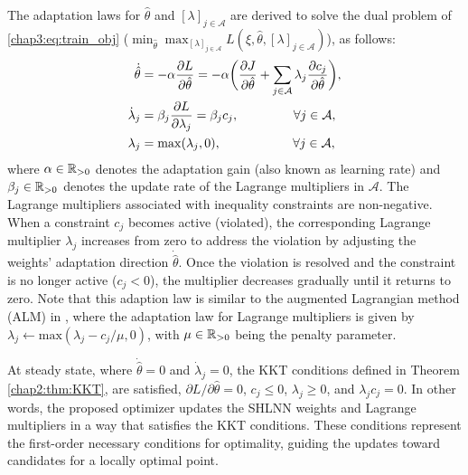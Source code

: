 The adaptation laws for $\hat\theta$ and $[\lambda]_{j\in\mathcal A}$ are derived to solve the dual problem of \eqref{chap3:eq:train_obj} (\ie  $\min_{\hat\theta} \max_{[\lambda]_{j\in\mathcal A}}L(\xi,\hat\theta,[\lambda]_{j\in\mathcal A})$), as follows:
\begin{subequations}
    \begin{align}
            \dot {\hat\theta}&=-\alpha {\partial L\over\partial \hat\theta}
            =-\alpha 
            \bigg(
            {\partial J\over \partial \hat\theta}+\sum_{j\in\mathcal{A}}
            \lambda_j {\partial c_j\over\partial \hat\theta}
            \bigg),
        \label{chap3:eq:adap_th}
            \\
            \dot\lambda_j& = \beta_j{\partial L\over\partial \lambda_j} = \beta_j c_j ,
            \quad\quad\quad\quad      \      
            \forall j\in\mathcal A,
        \label{chap3:eq:adap_L}
            \\
            \lambda_j & = \max(\lambda_j,0) ,
            \quad\quad\quad\quad\ \ \ \ \ 
            \forall j\in\mathcal A,
        \label{chap3:eq:adap_L_max}
    \end{align}
    \label{chap3:eq:adap}
\end{subequations}
where $\alpha\in\mathbb{R}_{>0}$ denotes the adaptation gain (also known as learning rate) and $\beta_j\in\mathbb{R}_{>0}$ denotes the update rate of the Lagrange multipliers in $\mathcal A$. 
The Lagrange multipliers associated with inequality constraints are non-negative.
When a constraint $c_j$ becomes active (\ie violated), the corresponding Lagrange multiplier $\lambda_j$ increases from zero to address the violation by adjusting the weights' adaptation direction $\dot{\hat\theta}$. 
Once the violation is resolved and the constraint is no longer active (\ie $c_j < 0$), the multiplier decreases gradually until it returns to zero. 
Note that this adaption law is similar to the augmented Lagrangian method (ALM) in \cite{RN9}, where the adaptation law for Lagrange multipliers is given by $\lambda_j\leftarrow \text{max}(\lambda_j-c_j/\mu,0)$, with $\mu\in\mathbb{R}_{>0}$ being the penalty parameter. 
    
At steady state, where $\dot{\hat\theta}=0$ and $\dot\lambda_j=0$, the KKT conditions defined in Theorem \ref{chap2:thm:KKT}, are satisfied, \ie $\partial L/\partial \hat\theta=0$, $c_j \le 0$, $\lambda_j \ge 0$, and $\lambda_j c_j=0$.
In other words, the proposed optimizer updates the SHLNN weights and Lagrange multipliers in a way that satisfies the KKT conditions. 
These conditions represent the first-order necessary conditions for optimality, guiding the updates toward candidates for a locally optimal point.

